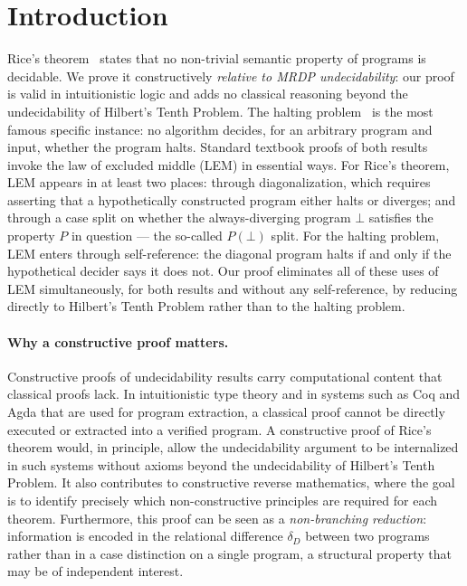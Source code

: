 \documentclass{lmcs}
\begin{document}
\section{Introduction}

Rice's theorem~\cite{rice1953} states that no non-trivial semantic property
of programs is decidable. We prove it constructively \emph{relative to
MRDP undecidability}: our proof is valid in intuitionistic logic and adds
no classical reasoning beyond the undecidability of Hilbert's Tenth Problem. The halting problem~\cite{turing1936} is the most famous specific instance: no
algorithm decides, for an arbitrary program and input, whether the program
halts. Standard textbook proofs of both results invoke the
law of excluded middle (LEM) in essential ways. For Rice's theorem, LEM appears in at least two
places: through diagonalization, which requires asserting that a hypothetically
constructed program either halts or diverges; and through a case split on
whether the always-diverging program $\bot$ satisfies the property $P$ in
question --- the so-called $P(\bot)$ split. For the halting problem, LEM
enters through self-reference: the diagonal program halts if and only if the
hypothetical decider says it does not. Our proof eliminates all of these uses of LEM simultaneously, for both
results and without any self-reference, by reducing directly to
Hilbert's Tenth Problem rather than to the halting problem.

\paragraph{Why a constructive proof matters.}
Constructive proofs of undecidability results carry computational content
that classical proofs lack. In intuitionistic type theory and in systems
such as Coq and Agda that are used for program extraction, a classical proof
cannot be directly executed or extracted into a verified program. A
constructive proof of Rice's theorem would, in principle, allow the
undecidability argument to be internalized in such systems without axioms
beyond the undecidability of Hilbert's Tenth Problem. It also contributes
to constructive reverse mathematics, where the goal is to identify precisely
which non-constructive principles are required for each theorem.
Furthermore, this proof can be seen as a \emph{non-branching reduction}:
information is encoded in the relational difference $\delta_D$ between two
programs rather than in a case distinction on a single program, a structural
property that may be of independent interest.
\end{document}
